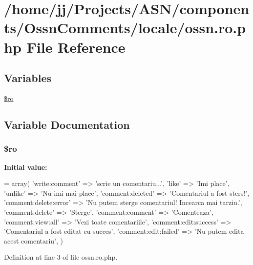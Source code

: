 \hypertarget{components_2_ossn_comments_2locale_2ossn_8ro_8php}{}\section{/home/jj/\+Projects/\+A\+S\+N/components/\+Ossn\+Comments/locale/ossn.ro.\+php File Reference}
\label{components_2_ossn_comments_2locale_2ossn_8ro_8php}
\subsection*{Variables}
\begin{DoxyCompactItemize}
\item 
\hyperlink{components_2_ossn_comments_2locale_2ossn_8ro_8php_ad432e1965f7fa8ce0807b244734e70f8}{\$ro}
\end{DoxyCompactItemize}


\subsection{Variable Documentation}
\subsubsection[{\texorpdfstring{\$ro}{$ro}}]{\setlength{\rightskip}{0pt plus 5cm}\$ro}\hypertarget{components_2_ossn_comments_2locale_2ossn_8ro_8php_ad432e1965f7fa8ce0807b244734e70f8}{}\label{components_2_ossn_comments_2locale_2ossn_8ro_8php_ad432e1965f7fa8ce0807b244734e70f8}
{\bfseries Initial value\+:}
\begin{DoxyCode}
= array(
    \textcolor{stringliteral}{'write:comment'} => \textcolor{stringliteral}{'scrie un comentariu...'},
    \textcolor{stringliteral}{'like'} => \textcolor{stringliteral}{'Imi place'},
    \textcolor{stringliteral}{'unlike'} => \textcolor{stringliteral}{'Nu imi mai place'},
    \textcolor{stringliteral}{'comment:deleted'} => \textcolor{stringliteral}{'Comentariul a fost sters!'},
    \textcolor{stringliteral}{'comment:delete:error'} => \textcolor{stringliteral}{'Nu putem sterge comentariul! Incearca mai tarziu.'},
    \textcolor{stringliteral}{'comment:delete'} => \textcolor{stringliteral}{'Sterge'},
    \textcolor{stringliteral}{'comment:comment'} => \textcolor{stringliteral}{'Comenteaza'},
    \textcolor{stringliteral}{'comment:view:all'} => \textcolor{stringliteral}{'Vezi toate comentariile'},
    \textcolor{stringliteral}{'comment:edit:success'} => \textcolor{stringliteral}{'Comentariul a fost editat cu succes'},
    \textcolor{stringliteral}{'comment:edit:failed'} => \textcolor{stringliteral}{'Nu putem edita acest comentariu'},
)
\end{DoxyCode}


Definition at line 3 of file ossn.\+ro.\+php.

